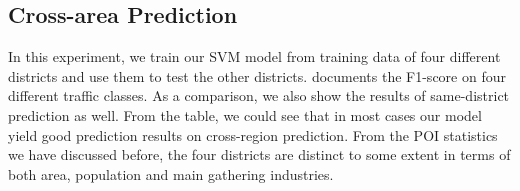 %

\subsection{Cross-area Prediction}
In this experiment, we train our SVM model from training data of
four different districts and use them to test the other districts.
 documents the F1-score on four different traffic
classes. As a comparison, we also show the results of
same-district prediction as well. From the table, we could see that in most cases our model yield good prediction results on cross-region prediction. From the POI statistics we have discussed before, the four districts are distinct to some extent in terms of both area, population and main gathering industries. 

